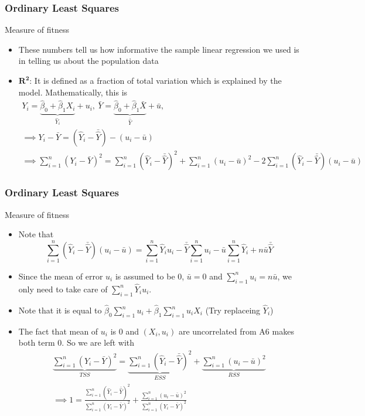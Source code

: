 \documentclass[compress]{beamer}
\begin{document}
\begin{frame}
\frametitle{Ordinary Least Squares}
Measure of fitness
\begin{itemize}
\item These numbers tell us how informative the sample linear regression we used is in telling us about the population data
\item $\mathbf{R^2}$: It is defined as a fraction of total variation which is explained by the model. Mathematically, this is
\footnotesize{%
\begin{gather*} 
Y_i = \underbrace{\hat{\beta}_0 + \hat{\beta}_1X_i}_{\hat{Y}_i} + u_i, \ \bar{Y} = \underbrace{\hat{\beta}_0 + \hat{\beta}_1\bar{X}}_{\bar{\hat{Y}}} + \bar{u}, \\
\implies Y_i-\bar{Y} = (\hat{Y}_i - \bar{\hat{Y}}) - (u_i - \bar{u}) \\
\implies \sum_{i=1}^n (Y_i-\bar{Y})^2= \sum_{i=1}^n (\hat{Y}_i - \bar{\hat{Y}})^2+\sum_{i=1}^n(u_i - \bar{u})^2 - 2\sum_{i=1}^n(\hat{Y}_i - \bar{\hat{Y}}) (u_i - \bar{u})
\end{gather*}}\normalsize
\end{itemize}
\end{frame}

\begin{frame}
\frametitle{Ordinary Least Squares}
Measure of fitness
\begin{itemize}
\item Note that 
\footnotesize{\[
\sum_{i=1}^n(\hat{Y}_i - \bar{\hat{Y}}) (u_i - \bar{u})=\sum_{i=1}^n\hat{Y}_i{u}_i-\bar{\hat{Y}}\sum_{i=1}^nu_i -\bar{u}\sum_{i=1}^n\hat{Y}_i +n\bar{u}\bar{\hat{Y}}
\]}\normalsize
\item Since the mean of error $u_i$ is assumed to be 0, $\bar{u}=0$ and $\sum_{i=1}^nu_i = n\bar{u}$, we only need to take care of $\sum_{i=1}^n\hat{Y}_i{u}_i$. 
\item Note that it is equal to $\hat{\beta}_0\sum_{i=1}^nu_i + \hat{\beta}_1\sum_{i=1}^nu_iX_i$ (Try replaceing $\hat{Y}_i$)
\item The fact that mean of $u_i$ is 0 and $(X_i, u_i)$ are uncorrelated from A6 makes both term 0. So we are left with
\footnotesize{\begin{gather*}
\underbrace{\sum_{i=1}^n (Y_i-\bar{Y})^2}_{TSS}= \underbrace{\sum_{i=1}^n (\hat{Y}_i - \bar{\hat{Y}})^2}_{ESS}+\underbrace{\sum_{i=1}^n(u_i - \bar{u})^2}_{RSS} \\
\implies 1=\frac{\sum_{i=1}^n (\hat{Y}_i - \bar{\hat{Y}})^2}{\sum_{i=1}^n (Y_i-\bar{Y})^2} + \frac{\sum_{i=1}^n(u_i - \bar{u})^2 }{\sum_{i=1}^n (Y_i-\bar{Y})^2}
\end{gather*}}\normalsize
\end{itemize}
\end{frame}
\end{document}
